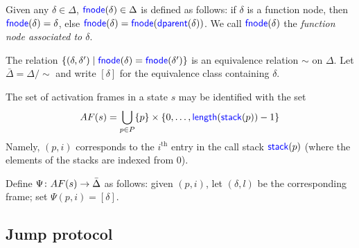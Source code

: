 \documentclass[11pt]{book}
\begin{document}
\begin{definition}
  Given any $\delta\in\Delta$, $\textsf{\textcolor{blue}{\textup{fnode}}}(\delta)\in\Delta$ is defined as
  follows: if $\delta$ is a function node, then
  $\textsf{\textcolor{blue}{\textup{fnode}}}(\delta)=\delta$, else
  $\textsf{\textcolor{blue}{\textup{fnode}}}(\delta)=\textsf{\textcolor{blue}{\textup{fnode}}}(\textsf{\textcolor{blue}{\textup{dparent}}}(\delta))$.  We call $\textsf{\textcolor{blue}{\textup{fnode}}}(\delta)$
  the \emph{function node associated to $\delta$}.
\end{definition}

The relation $\{(\delta,\delta')\mid \textsf{\textcolor{blue}{\textup{fnode}}}(\delta)=\textsf{\textcolor{blue}{\textup{fnode}}}(\delta')\}$
is an equivalence relation $\sim$ on $\Delta$.  Let
$\bar{\Delta}=\Delta/\sim$ and write $[\delta]$ for the equivalence
class containing $\delta$.

The set of activation frames in a state $s$ may be identified with the 
set
\[
AF(s)=\bigcup_{p\in P}\{p\}\times\{0,\ldots,\textsf{\textcolor{blue}{\textup{length}}}(\textsf{\textcolor{blue}{\textup{stack}}}(p))-1\}
\]
Namely, $(p,i)$ corresponds to the $i^{\text{th}}$ entry in the call
stack $\textsf{\textcolor{blue}{\textup{stack}}}(p)$ (where the elements of the stacks are indexed from
$0$).

Define $\Psi\colon AF(s)\rightarrow \bar{\Delta}$ as follows: given $(p,i)$,
let $(\delta,l)$ be the corresponding frame; set $\Psi(p,i)=[\delta]$.



\subsection{Jump protocol}
\label{sec:jump}



\end{document}
